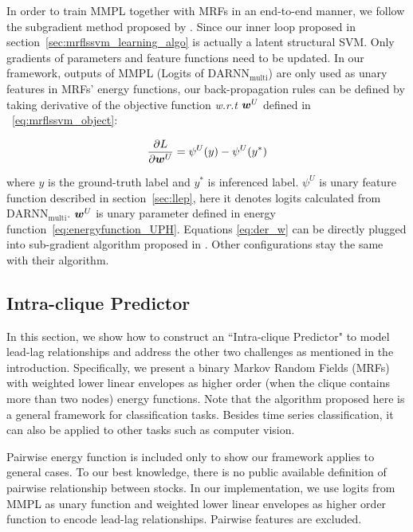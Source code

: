 In order to train MMPL together with MRFs in an end-to-end
manner, we follow the subgradient method proposed by
. Since our inner loop
proposed in section~\ref{sec:mrflssvm_learning_algo} is actually
a latent structural SVM. Only gradients of parameters and feature
functions need to be updated. In our framework, outputs of
MMPL (Logits of $\text{DARNN}_{\text{multi}}$) are only used as unary features in MRFs' energy functions,
our back-propagation rules can be defined by taking derivative of the objective function \textit{w.r.t} ${\bm{w}}^U$  defined in
~\eqref{eq:mrflssvm_object}:

\begin{align}
  \label{eq:der_w}
  \frac{\partial L}{\partial {\bm{w}}^U} = \psi^U(y)-\psi^U(y^*)
\end{align}

\noindent where $y$ is the ground-truth label and $y^*$ is
inferenced label. $\psi^U$ is unary feature
function described in section~\ref{sec:llep}, here it denotes
logits calculated from $\text{DARNN}_{\text{multi}}$. ${\bm{w}}^U$ is
unary parameter defined in energy function~\eqref{eq:energyfunction_UPH}.
Equations \eqref{eq:der_w} can be directly plugged
into sub-gradient algorithm proposed in \cite{witoonchart2017application}.
Other configurations stay the same with their algorithm.

\subsection{Intra-clique Predictor}
\label{sec:srp}

In this section, we show how to construct an ``Intra-clique
Predictor" to model lead-lag relationships and address the other
two challenges as mentioned in the introduction. Specifically, we
present a binary Markov Random Fields (MRFs) with weighted lower
linear envelopes as higher order (when the clique contains more
than two nodes) energy functions. Note that the algorithm
proposed here is a general framework for classification tasks.
Besides time series classification, it can also be applied to other tasks such as computer vision.

Pairwise energy function is included only to show our framework
applies to general cases. To our best knowledge, there is no
public available definition of pairwise relationship between
stocks. In our implementation, we use logits from MMPL as unary
function and weighted lower linear envelopes as higher order
function to encode lead-lag relationships. Pairwise features are
excluded.


